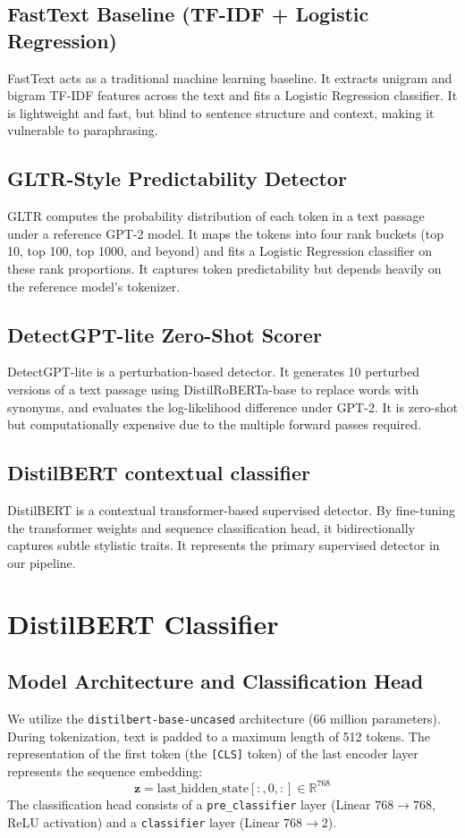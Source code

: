 \documentclass[12pt,a4paper]{report}
\begin{document}
\section{FastText Baseline (TF-IDF + Logistic Regression)}
FastText acts as a traditional machine learning baseline. It extracts unigram and bigram TF-IDF features across the text and fits a Logistic Regression classifier. It is lightweight and fast, but blind to sentence structure and context, making it vulnerable to paraphrasing.

\section{GLTR-Style Predictability Detector}
GLTR computes the probability distribution of each token in a text passage under a reference GPT-2 model. It maps the tokens into four rank buckets (top 10, top 100, top 1000, and beyond) and fits a Logistic Regression classifier on these rank proportions. It captures token predictability but depends heavily on the reference model's tokenizer.

\section{DetectGPT-lite Zero-Shot Scorer}
DetectGPT-lite is a perturbation-based detector. It generates 10 perturbed versions of a text passage using DistilRoBERTa-base to replace words with synonyms, and evaluates the log-likelihood difference under GPT-2. It is zero-shot but computationally expensive due to the multiple forward passes required.

\section{DistilBERT contextual classifier}
DistilBERT is a contextual transformer-based supervised detector. By fine-tuning the transformer weights and sequence classification head, it bidirectionally captures subtle stylistic traits. It represents the primary supervised detector in our pipeline.

\chapter{DistilBERT Classifier}
\label{ch:distilbert}

\section{Model Architecture and Classification Head}
We utilize the \texttt{distilbert-base-uncased} architecture (66 million parameters). During tokenization, text is padded to a maximum length of 512 tokens. The representation of the first token (the \texttt{[CLS]} token) of the last encoder layer represents the sequence embedding:
$$\mathbf{z} = \text{last\_hidden\_state}[:, 0, :] \in \mathbb{R}^{768}$$
The classification head consists of a \texttt{pre\_classifier} layer (Linear $768 \to 768$, ReLU activation) and a \texttt{classifier} layer (Linear $768 \to 2$).
\end{document}
